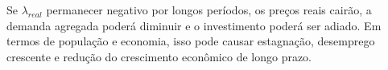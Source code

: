 Se $\lambda_{real}$ permanecer negativo por longos períodos, os preços reais cairão, a demanda agregada poderá diminuir e o investimento poderá ser adiado. Em termos de população e economia, isso pode causar estagnação, desemprego crescente e redução do crescimento econômico de longo prazo. 